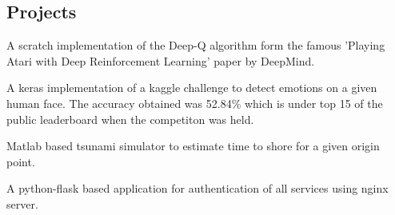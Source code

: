 \documentclass[letterpaper]{deedy-resume} %
\begin{document}
\begin{minipage}[t]{0.66\textwidth}
\subsection{Projects}
\vspace{\topsep} %
\begin{tightitemize}
\item {} A scratch implementation of the Deep-Q algorithm form the famous 'Playing Atari with Deep Reinforcement Learning' paper by DeepMind.
\item {} A keras implementation of a kaggle challenge to detect emotions on a given human face. The accuracy obtained was 52.84\% which is under top 15 of the public leaderboard when the competiton was held.
\item {} Matlab based tsunami simulator to estimate time to shore for a given origin point.
\item {} A python-flask based application for authentication of all services using nginx server.
\item {}
\end{tightitemize}

\sectionspace %


\end{minipage} %



\end{document}
